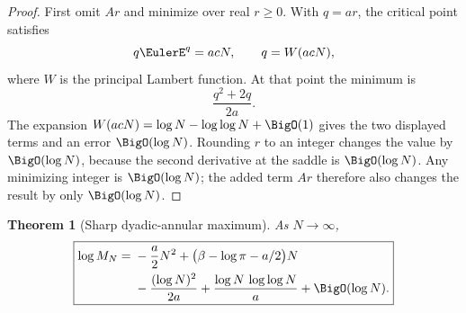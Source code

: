 \documentclass[11pt,oneside]{article}
\newtheorem{theorem}{Theorem}[section]
\theoremstyle{definition}
\theoremstyle{remark}
\begin{document}
\begin{proof}
First omit $Ar$ and minimize over real $r\ge0$.  With $q=ar$, the critical
point satisfies
\[
 q\EulerE^q=acN,
 \qquad q=W(acN),
\]
where $W$ is the principal Lambert function.  At that point the minimum is
\[
 \frac{q^2+2q}{2a}.
\]
The expansion $W(acN)=\log N-\log\log N+\BigO(1)$ gives the two displayed
terms and an error $\BigO(\log N)$.  Rounding $r$ to an integer changes the
value by $\BigO(\log N)$, because the second derivative at the saddle is
$\BigO(\log N)$.  Any minimizing integer is $\BigO(\log N)$; the added term
$Ar$ therefore also changes the result by only $\BigO(\log N)$.
\end{proof}

\begin{theorem}[Sharp dyadic-annular maximum]
As $N\to\infty$,
\begin{equation}
 \boxed{\begin{aligned}
 \log M_N={}&-\frac a2N^2
 +\bigl(\beta-\log\pi-a/2\bigr)N\\
 &-\frac{(\log N)^2}{2a}
 +\frac{\log N\,\log\log N}{a}
 +\BigO(\log N).
 \end{aligned}}                                             \label{eq:MN-sharp}
\end{equation}
\end{theorem}
\end{document}
